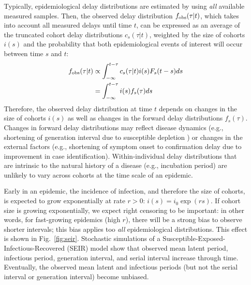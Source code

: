 \documentclass[12pt]{article}
\newcommand{\fref}[1]{Fig.~\ref{fig:#1}}
\begin{document}
Typically, epidemiological delay distributions are estimated by using \emph{all} available measured samples.
Then, the observed delay distribution $f_{\tiny\textrm{obs}}(\tau|t)$, which takes into account all measured delays until time $t$, can be expressed as an average of the truncated cohort delay distributions $c_s(\tau|t)$, weighted by the size of cohorts $i(s)$ and the probability that both epidemiological events of interest will occur between time $s$ and $t$:
\begin{equation}
\begin{aligned}
f_{\tiny\textrm{obs}}(\tau|t) &\propto \int_{-\infty}^{t-\tau} c_s(\tau|t) i(s) F_s(t-s) ds\\
&= \int_{-\infty}^{t-\tau} i(s) f_s(\tau) ds
\end{aligned}
\end{equation}
Therefore, the observed delay distribution at time $t$ depends on changes in the size of cohorts $i(s)$ as well as changes in the forward delay distributions $f_s(\tau)$.
Changes in forward delay distributions may reflect disease dynamics (e.g., shortening of generation interval due to susceptible depletion \citep{champredon2015intrinsic}) or changes in the external factors (e.g., shortening of symptom onset to confirmation delay due to improvement in case identification).
Within-individual delay distributions that are intrinsic to the natural history of a disease (e.g., incubation period) are unlikely to vary across cohorts at the time scale of an epidemic.

Early in an epidemic, the incidence of infection, and therefore the size of cohorts, is expected to grow exponentially at rate $r > 0$: $i(s) = i_0 \exp(rs)$.
If cohort size is growing exponentially, we expect right censoring to be important: in other words, for fast-growing epidemics (high $r$), there will be a strong bias to observe shorter intervals;
this bias applies too \emph{all} epidemiological distributions.
This effect is shown in \fref{seir}.
Stochastic simulations of a Susceptible-Exposed-Infectious-Recovered (SEIR) model show that observed mean latent period, infectious period, generation interval, and serial interval increase through time.
Eventually, the observed mean latent and infectious periods (but not the serial interval or generation interval) become unbiased.
\end{document}
